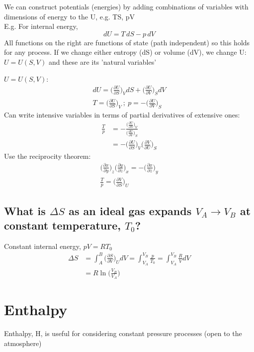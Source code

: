 \documentclass[a4paper, 11pt, normalem]{report}
\newcommand\p{\partial}
\begin{document}
We can construct potentials (energies) by adding combinations of variables with dimensions of energy to the U, e.g. TS, pV \\
E.g. For internal energy,
\begin{equation*}
    dU = T\,dS - p\,dV
\end{equation*}
All functions on the right are functions of state (path independent) so this holds for any process. If we change either entropy (dS) or volume (dV), we change U: $U = U(S,V)$ and these are its 'natural variables'

$U = U(S,V)$:
\begin{gather*}
    dU = \Big(\frac{\p U}{\p S}\Big)_V dS + \Big(\frac{\p U}{\p V}\Big)_S dV \\
    T = \Big(\frac{\p U}{\p S}\Big)_V ~;~ p = -\Big(\frac{\p U}{\p V}\Big)_S
\end{gather*}
Can write intensive variables in terms of partial derivatives of extensive ones:
\begin{align*}
    \frac{T}{p} &= -\frac{\big(\tfrac{\p U}{\p S}\big)_V}{\big(\tfrac{\p U}{\p V}\big)_S} \\
    &= -\Big(\frac{\p U}{\p S}\Big)_V \Big(\frac{\p V}{\p U}\Big)_S
\end{align*}
Use the reciprocity theorem:
\begin{gather*}
    \Big(\frac{\p x}{\p y}\Big)_z \Big(\frac{\p y}{\p z}\Big)_x = -\Big(\frac{\p x}{\p z}\Big)_y \\
    \frac{T}{p} = \Big(\frac{\p V}{\p S}\Big)_U
\end{gather*}

\subsection{What is $\Delta S$ as an ideal gas expands $V_A \to V_B$ at constant temperature, $T_0$?}
Constant internal energy, $pV = RT_0$
\begin{align*}
    \Delta S &= \int_{A}^{B} \Big(\frac{\p S}{\p V}\Big)_U dV = \int_{V_A}^{V_B} \frac{p}{T_0} = \int_{V_A}^{V_B} \frac{R}{V}dV \\
    &= R\ln\Big(\frac{V_B}{V_A}\Big)
\end{align*}

\section{Enthalpy}
Enthalpy, H, is useful for considering constant pressure processes (open to the atmosphere)
\end{document}
